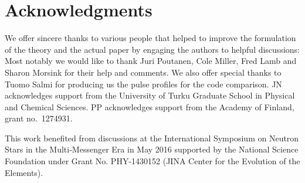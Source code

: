 \documentclass{aa}
\newcommand{\red}[1]{\textcolor{red}{#1}}
\begin{document}
\section*{Acknowledgments}

\small{
We offer sincere thanks to various people that helped to improve the formulation of the theory and the actual paper by engaging the authors to helpful discussions: 
Most notably we would like to thank Juri Poutanen, Cole Miller, Fred Lamb and Sharon Morsink for their help and comments.
We also offer special thanks to Tuomo Salmi for producing us the pulse profiles for the code comparison.
JN acknowledges support from the University of Turku Graduate School in Physical and Chemical Sciences.
PP acknowledges support from the Academy of Finland, grant no.~1274931.

This work benefited from discussions at the International Symposium on Neutron Stars in the Multi-Messenger Era in May 2016 supported by the National Science Foundation under Grant No. PHY-1430152 (JINA Center for the Evolution of the Elements).
}



%
\end{document}
